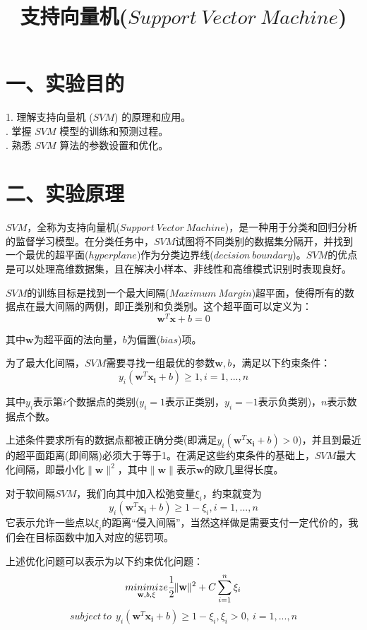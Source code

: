 \documentclass{article}
\begin{document}
\title{\Huge \centering \textbf{支持向量机($Support\ Vector \ Machine$)}}
\date{}
\maketitle
\setlength{\parskip}{0.5\baselineskip}
\section*{\LARGE 一、实验目的}

1. 理解支持向量机 ($SVM$) 的原理和应用。\\
. 掌握 $SVM$ 模型的训练和预测过程。\\
. 熟悉 $SVM$ 算法的参数设置和优化。

\section*{\LARGE 二、实验原理}
$SVM$，全称为支持向量机($Support\ Vector\ Machine$)，是一种用于分类和回归分析的监督学习模型。在分类任务中，$SVM$试图将不同类别的数据集分隔开，并找到一个最优的超平面($hyperplane$)作为分类边界线($decision\ boundary$)。$SVM$的优点是可以处理高维数据集，且在解决小样本、非线性和高维模式识别时表现良好。

$SVM$的训练目标是找到一个最大间隔($Maximum\ Margin$)超平面，使得所有的数据点在最大间隔的两侧，即正类别和负类别。这个超平面可以定义为：
$$\mathbf{w}^T\mathbf{x}+b=0$$

其中$\mathbf{w}$为超平面的法向量，$b$为偏置($bias$)项。

为了最大化间隔，$SVM$需要寻找一组最优的参数$\mathbf{w}, b$，满足以下约束条件：
$$y_i(\mathbf{w}^T\mathbf{x_i}+b) \geq 1, i =1,...,n$$

其中$y_i$表示第$i$个数据点的类别($y_i=1$表示正类别，$y_i=-1$表示负类别)，$n$表示数据点个数。

上述条件要求所有的数据点都被正确分类(即满足$y_i(\mathbf{w}^T\mathbf{x_i}+b)>0$)，并且到最近的超平面距离(即间隔)必须大于等于1。在满足这些约束条件的基础上，$SVM$最大化间隔，即最小化$\lVert \mathbf{w} \rVert^2$，其中$\lVert \mathbf{w} \rVert$表示$\mathbf{w}$的欧几里得长度。

对于软间隔$SVM$，我们向其中加入松弛变量$\xi_i$，约束就变为
$$y_i(\mathbf{w}^T\mathbf{x_i}+b) \geq 1-\xi_i, i =1,...,n$$
它表示允许一些点以$\xi_i$的距离“侵入间隔”，当然这样做是需要支付一定代价的，我们会在目标函数中加入对应的惩罚项。

上述优化问题可以表示为以下约束优化问题：
$$\underset{\mathbf{w},b,\xi}{minimize} \cfrac{1}{2} \lVert \mathbf{w} \rVert^2+C\sum_{i=1}^{n}\xi_i$$
$$ subject\ to\ \  y_i(\mathbf{w}^T\mathbf{x_i}+b)\geq1-\xi_i, \xi_i>0,\ i =1,...,n$$
\end{document}
